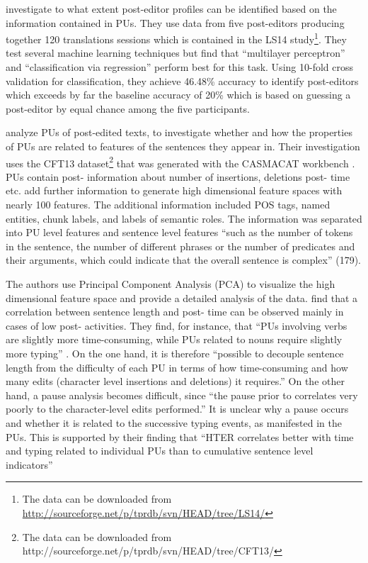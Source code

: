 \documentclass[output=paper]{LSP/langsci}
\begin{document}
\citet{Singla2014} investigate to what extent post-editor profiles can be identified based on the information contained in PUs. They use data from five post-editors producing together 120 translations sessions which is contained in the LS14 study\footnote{ The data can be downloaded from \url{http://sourceforge.net/p/tprdb/svn/HEAD/tree/LS14/}}. They test several machine learning techniques but find that ``multilayer perceptron'' and ``classification via regression'' perform best for this task. Using 10-fold cross validation for classification, they achieve 46.48\% accuracy to identify post-editors which exceeds by far the baseline accuracy of 20\% which is based on guessing a post-editor by equal chance among the five participants.

\citet{Aziz2014} analyze PUs of post-edited texts, to investigate whether and how the properties of PUs are related to features of the sentences they appear in. Their investigation uses the CFT13 dataset\footnote{ The data can be downloaded from http://sourceforge.net/p/tprdb/svn/HEAD/tree/CFT13/} that was generated with the CASMACAT workbench \citep{Alabau2014}. PUs contain post- information about number of insertions, deletions post- time etc. \citet{Aziz2014} add further information to generate high dimensional feature spaces with nearly 100 features. The additional information included POS tags, named entities, chunk labels, and labels of semantic roles. The information was separated into PU level features and sentence level features ``such as the number of tokens in the sentence, the number of different phrases or the number of predicates and their arguments, which could indicate that the overall sentence is complex'' (179).

The authors use Principal Component Analysis (PCA) to visualize the high dimensional feature space and provide a detailed analysis of the data. \citet{Aziz2014} find that a correlation between sentence length and post- time can be observed mainly in cases of low post- activities. They find, for instance, that ``PUs involving verbs are slightly more time-consuming, while PUs related to nouns require slightly more typing'' \citep[189]{Aziz2014}. On the one hand, it is therefore ``possible to decouple sentence length from the difficulty of each PU in terms of how time-consuming and how many edits (character level insertions and deletions) it requires.'' \citep[189]{Aziz2014} On the other hand, a pause analysis becomes difficult, since ``the pause prior to  correlates very poorly to the character-level edits performed.'' \citep[187]{Aziz2014} It is unclear why a pause occurs and whether it is related to the successive typing events, as manifested in the PUs. This is supported by their finding that ``HTER correlates better with time and typing related to individual PUs than to cumulative sentence level indicators'' \citep[187]{Aziz2014}
\end{document}
